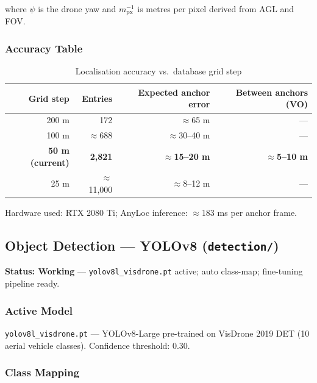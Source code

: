 \documentclass[11pt,a4paper]{article}
\begin{document}
where $\psi$ is the drone yaw and $m_\text{px}^{-1}$ is metres per pixel derived from AGL and FOV.

\subsubsection*{Accuracy Table}

\begin{table}[h]
\centering
\caption{Localisation accuracy vs.\ database grid step}
\begin{tabular}{@{}rrrr@{}}
\toprule
\textbf{Grid step} & \textbf{Entries} & \textbf{Expected anchor error} & \textbf{Between anchors (VO)}\\
\midrule
200 m & 172 & $\approx$65 m & ---\\
100 m & $\approx$688 & $\approx$30--40 m & ---\\
\textbf{50 m (current)} & \textbf{2,821} & \textbf{$\approx$15--20 m} & \textbf{$\approx$5--10 m}\\
25 m & $\approx$11,000 & $\approx$8--12 m & ---\\
\bottomrule
\end{tabular}
\end{table}

Hardware used: RTX 2080 Ti; AnyLoc inference: $\approx$183 ms per anchor frame.

\subsection{Object Detection --- YOLOv8 (\texttt{detection/})}
\label{sec:yolo}

\begin{donebox}
\textbf{Status: Working} --- \texttt{yolov8l\_visdrone.pt} active; auto class-map; fine-tuning pipeline ready.
\end{donebox}

\vspace{6pt}

\subsubsection*{Active Model}

\texttt{yolov8l\_visdrone.pt} --- YOLOv8-Large pre-trained on VisDrone 2019 DET
(10 aerial vehicle classes).  Confidence threshold: 0.30.

\subsubsection*{Class Mapping}
\end{document}
